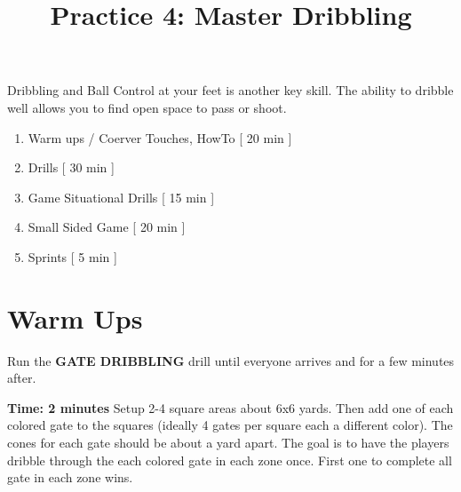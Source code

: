 \documentclass[10pt,letterpaper]{article}
\title{\vspace{-.5in}Practice 4: Master Dribbling}
\author{\vspace{-.5in}}
\date{\vspace{-.5in}}
\newenvironment{agendablock}[1]{%
    \tcolorbox[beamer,%
    noparskip,breakable,
    colback=LightGray,colframe=Black,%
    colbacklower=Gray!75!LightGray,%
    title=#1]}%
    {\endtcolorbox}
\newenvironment{oddBlock}[1]{%
    \tcolorbox[beamer,%
    noparskip,breakable,
    colback=LightBlue,colframe=DarkBlue,%
    colbacklower=DarkBlue!75!LightBlue,%
    title=#1]}%
    {\endtcolorbox}
\begin{document}
\selectfont

\maketitle

\begin{agendablock}{Practice Activities}
    Dribbling and Ball Control at your feet is another key skill.  The ability to dribble well allows you to find open space to pass or shoot. 
    \begin{enumerate}
        \item Warm ups / Coerver Touches, HowTo [ 20 min ]
        \item Drills [ 30 min ]
        \item Game Situational Drills [ 15 min ]
        \item Small Sided Game [ 20 min ]
        \item Sprints [ 5 min ]
    \end{enumerate}
\end{agendablock}

\section{Warm Ups}
Run the \textbf{GATE DRIBBLING} drill until everyone arrives and for a few minutes after.

\textbf{Time: 2 minutes}
\begin{oddBlock}{Gate Dribbling}
Setup 2-4 square areas about 6x6 yards.  Then add one of each colored gate to the squares (ideally 4 gates per square each a different color).  The cones for each gate should be about a yard apart.  The goal is to have the players dribble through the each colored gate in each zone once.  First one to complete all gate in each zone wins.
\end{oddBlock}
\end{document}
